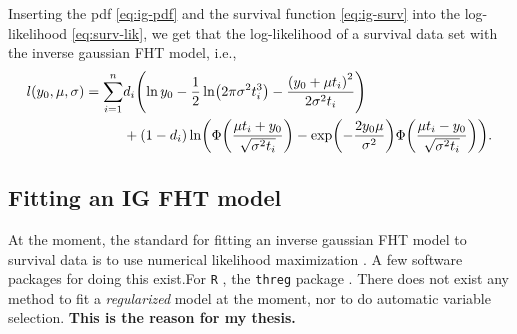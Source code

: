 Inserting the pdf \eqref{eq:ig-pdf} and the survival function \eqref{eq:ig-surv} into the log-likelihood \eqref{eq:surv-lik}, we get that the log-likelihood of a survival data set with the inverse gaussian FHT model, i.e.,
\begin{align}\label{eq:loglik}
\begin{split}
    l(y_0,\mu,\sigma)=\sum_{i=1}^n&d_i\p*{\ln y_0-\frac{1}{2}\ln\p*{2\pi\sigma^2\ti^3}-\frac{\p*{y_0+\mu\ti}^2}{2\sigma^2\ti}} \\
    &+
    (1-d_i)\ln\p*{\Phi\p*{\frac{\mu\ti+y_0}{\sqrt{\sigma^2\ti}}}-\exp\p*{-\frac{2y_0\mu}{\sigma^2}}\Phi\p*{\frac{\mu\ti-y_0}{\sqrt{\sigma^2\ti}}}}.
\end{split}
\end{align}

\subsection{Fitting an IG FHT model}
At the moment, the standard for fitting an inverse gaussian FHT model to survival data is to use numerical likelihood maximization \citep{caroni2017}. A few software packages for doing this exist.For \verb|R| \citep{Rlang}, the \verb|threg| package \citep{threg}. There does not exist any method to fit a \textit{regularized} model at the moment, nor to do automatic variable selection. \textbf{This is the reason for my thesis.}



